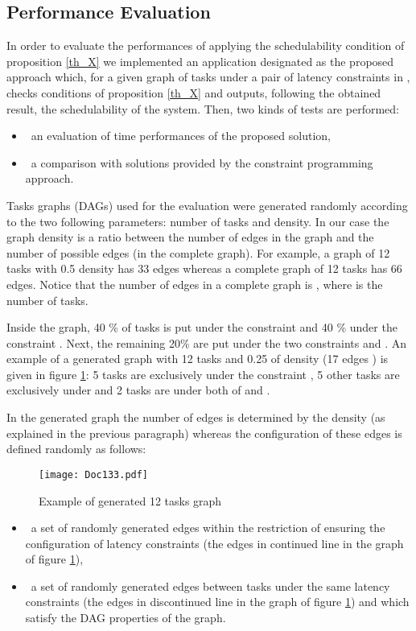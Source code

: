 \documentclass{ijcaArticle}
\begin{document}
\subsection{Performance Evaluation}\label{first_tests}
 In order to evaluate the performances of applying the schedulability condition of proposition \ref{th_X} we implemented an application designated as the proposed approach which, for a given graph of tasks under a pair of latency constraints in , checks conditions of proposition  \ref{th_X} and outputs, following the obtained result, the schedulability of the system.  Then, two kinds of tests are performed:
\begin{itemize}
\item \ an evaluation of time performances of the proposed solution, 
\item \ a comparison with solutions provided by the constraint programming approach.
\end{itemize} 

        
Tasks graphs (DAGs) used for the evaluation were generated randomly according to the two following parameters: number of tasks  and density. In our case the graph density is a ratio between the number of edges in the graph and the number of  possible edges (in the complete graph). For example, a graph of 12 tasks with 0.5 density has 33 edges whereas
a complete graph of 12 tasks has 66 edges. Notice that the number of edges in a complete graph is , where  is the number of tasks.       

Inside the graph, 40 \% of tasks is put under the constraint  and 40 \%  under the constraint
. Next, the remaining 20\%  are put under the two constraints  and .  An example of a generated graph with 12 tasks and 0.25 of density (17 edges ) is given in figure \ref{rand}: 5 tasks are exclusively under the constraint , 5 other tasks are exclusively under   and 2 tasks are under both of  and
. 

In the generated graph the number of edges is determined by the density (as explained in the previous paragraph) whereas the configuration of these edges is defined randomly as follows:

\begin{figure}[h!] 
\begin{center} 
\texttt{[image: Doc133.pdf]} 
\caption{Example of generated 12 tasks graph} 
\label{rand} 
\end{center} 
\end{figure}


\begin{itemize}
\item \ a set of randomly generated edges within the restriction of ensuring the  configuration of latency constraints (the edges in continued line in the graph of figure \ref{rand}),   
\item \ a set of randomly generated edges between tasks under the same latency constraints (the edges in discontinued line in the graph of figure \ref{rand}) and which
satisfy the DAG properties of the graph.
\end{itemize}
\end{document}
